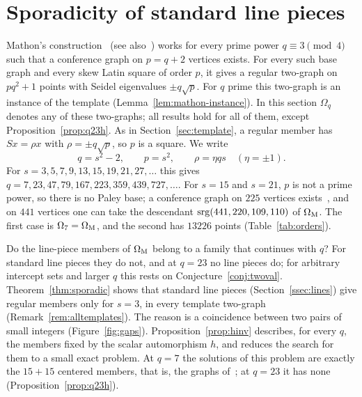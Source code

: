 
\section{Sporadicity of standard line pieces}\label{sec:sporadic}

Mathon's construction~\cite[Theorem~4.1]{Mathon1978} (see also~\cite{SeberryWhiteman1988}) works for every prime power
$q\equiv3\pmod4$ such that a conference graph on $p=q+2$ vertices exists. For every such base graph and every skew
Latin square of order $p$, it gives a regular two-graph on $pq^2+1$ points with Seidel eigenvalues $\pm q\sqrt p$. For
$q$ prime this two-graph is an instance of the template (Lemma~\ref{lem:mathon-instance}). In this section $\Omega_q$
denotes any of these two-graphs; all results hold for all of them, except Proposition~\ref{prop:q23h}. As in
Section~\ref{sec:template}, a regular member has $Sx=\rho x$ with $\rho=\pm q\sqrt p$, so $p$ is a square. We write
\[q=s^2-2,\qquad p=s^2,\qquad \rho=\eta qs\quad(\eta=\pm1).\]
For $s=3,5,7,9,13,15,19,21,27,\dots$ this gives $q=7,\allowbreak 23,\allowbreak 47,\allowbreak 79,\allowbreak
167,\allowbreak 223,\allowbreak 359,\allowbreak 439,\allowbreak 727,\dots$. For $s=15$ and $s=21$, $p$ is not a prime
power, so there is no Paley base; a conference graph on $225$ vertices exists~\cite[Theorem~4.1]{GoethalsSeidel1967}, and on $441$
vertices one can take the descendant $\mathrm{srg}(441,220,109,110)$ of $\Omega_{\mathrm M}$. The first case is $\Omega_7=\Omega_{\mathrm M}$, and the
second has $13226$ points (Table~\ref{tab:orders}).

Do the line-piece members of $\Omega_{\mathrm M}$ belong to a family that continues with $q$? For standard line pieces they do not,
and at $q=23$ no line pieces do; for arbitrary intercept sets and larger $q$ this rests on
Conjecture~\ref{conj:twoval}. Theorem~\ref{thm:sporadic} shows that standard line pieces (Section~\ref{ssec:lines}) give regular members only for
$s=3$, in every template two-graph (Remark~\ref{rem:alltemplates}). The reason is a coincidence between two pairs of
small integers (Figure~\ref{fig:gaps}). Proposition~\ref{prop:hinv} describes, for every $q$, the members fixed by the
scalar automorphism $h$, and reduces the search for them to a small exact problem. At $q=7$ the solutions of this
problem are exactly the $15+15$ centered members, that is, the graphs of~\cite{Plummer442}; at $q=23$ it has none
(Proposition~\ref{prop:q23h}).

